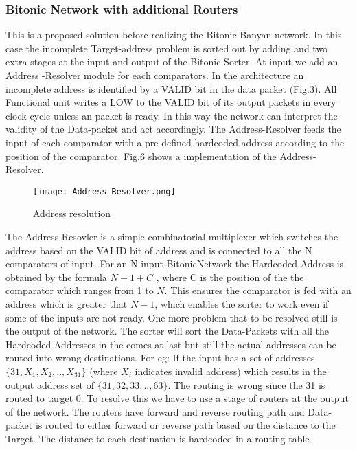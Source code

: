 				  \subsubsection{Bitonic Network with additional Routers}
					      This is a proposed solution before realizing the Bitonic-Banyan network. In this case the incomplete Target-address problem is sorted out by adding and two extra stages at the input and output of the Bitonic Sorter. At input we add an Address
					      -Resolver module for each comparators. In the architecture an incomplete address is identified by a VALID bit in the data packet (Fig.3). All Functional unit writes a 
					      LOW to the VALID bit of its output packets in every clock cycle unless an packet is ready. In this way the network can interpret the validity of the Data-packet and act accordingly.
					      The Address-Resolver feeds the input of each comparator with a pre-defined hardcoded address according to the position of the comparator. Fig.6 shows a implementation of the
					      Address-Resolver.
					      \begin{figure}[!ht]
							\texttt{[image: Address\_Resolver.png]}
						      \caption{Address resolution}
					      \end{figure}
					      The Address-Resovler is a simple combinatorial multiplexer which switches the address based on the VALID bit of address and is connected to all the N comparators of input.
					      For an N input BitonicNetwork the Hardcoded-Address is obtained by the formula $N -1 + C$ , where C is the position of the the comparator which ranges from 1 to $N$. This ensures the 
					      comparator is fed with an address which is greater that $N -1$, which enables the sorter to work even if some of the inputs are not ready. One more problem that to be resolved
					      still is the output of the network. The sorter will sort the Data-Packets with all the Hardcoded-Addresses in the comes at last but still the actual addresses can
					      be routed into wrong destinations. For eg: If the input has a set of addresses $\{31,X_{1},X_{2},..,X_{31}\}$ (where $X_{i}$ indicates invalid address) which results in the output address set of $\{31,32,33,..,63\}$.
					      The routing is wrong since the 31 is routed to target 0. To resolve this we have to use a stage of routers at the output of the network. The routers have forward and reverse
					      routing path and Data-packet is routed to either forward or reverse path based on the distance to the Target. The distance to each destination is hardcoded in a routing table
